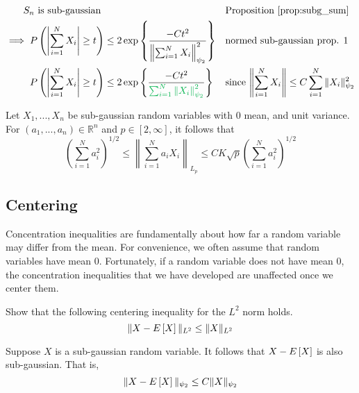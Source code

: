 \begin{align*}
    S_n \text{ is sub-gaussian }& && \text{Proposition \ref{prop:subg_sum}} \\ 
    \implies P\left(\left| \sum_{i=1}^{N} X_i \right| \geq t \right) &\leq 2 \exponential{\frac{-Ct^2}{\left\|\sum_{i=1}^{N} X_i\right\|_{\psi_2}^2}} && 
        \text{normed sub-gaussian prop. 1} \\ 
    P\left(\left| \sum_{i=1}^{N} X_i \right| \geq t \right) &\leq 2 \exponential{\frac{-Ct^2}{\textcolor{\dgreen}{\sum_{i=1}^{N}\left\| X_i\right\|_{\psi_2}^2}}} && \text{since $\left\| \sum_{i=1}^{N} X_i \right\| \leq C\sum_{i=1}^{N} \|X_i\|_{\psi_2}^{2}$}
\end{align*}


\begin{tcolorbox}
\begin{theorem}
Let $X_1, ..., X_n$ be sub-gaussian random variables with 0 mean, and unit variance. For $(a_1, ..., a_n) \in \mathbb{R}^n$ and $p \in [2, \infty]$, it follows that 
$$ \left(\sum_{i=1}^{N}a_i^2 \right)^{1/2} \leq \left\| \sum_{i=1}^{N}a_i X_i \right\|_{L_p} \leq C K \sqrt{p} \left(\sum_{i=1}^{N} a_i^2 \right)^{1/2} $$
\end{theorem}
\end{tcolorbox}


\subsection{Centering}
Concentration inequalities are fundamentally  about how far a random variable may differ from the mean. For convenience, we often assume that random variables have mean 0. Fortunately, if a random variable does not have mean 0, the concentration inequalities that we have developed are unaffected once we center them. 

\begin{tcolorbox}
\begin{example}
    Show that the following centering inequality for the $L^2$ norm holds. 
    $$\|X - E\left[X \right] \|_{L^2} \leq \|X\|_{L^2}$$
\end{example}
\end{tcolorbox}

\begin{tcolorbox}
\begin{lemma}
Suppose $X$ is a sub-gaussian random variable. It follows that $X - E\left[X \right]$ is also sub-gaussian. That is, 
$$\|X - E\left[X \right] \|_{\psi_2} \leq C \|X\|_{\psi_2}$$
\end{lemma}
\end{tcolorbox}

